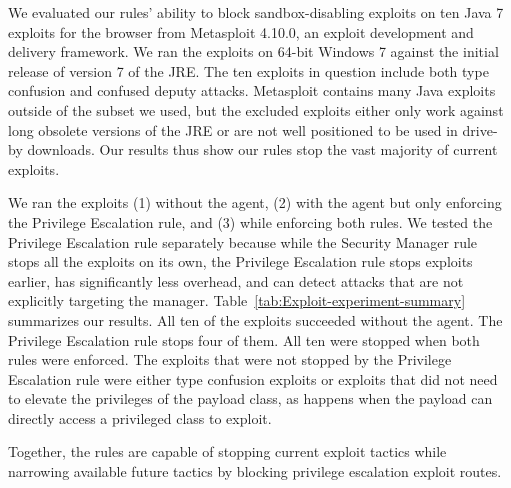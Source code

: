 \documentclass{sig-alternate}
\begin{document}
We evaluated our rules' ability to block sandbox-disabling exploits on ten
Java 7 exploits for the browser from Metasploit 4.10.0, an exploit development
and delivery framework.  We ran the exploits on 64-bit Windows 7 against the initial release of
version 7 of the JRE.  The ten exploits in question include both type confusion and confused
deputy attacks.
Metasploit contains many Java exploits outside of the 
subset we used, but the excluded exploits either only work against long obsolete
versions of the JRE or are not well positioned to be used in drive-by
downloads.  Our results thus show our rules stop the vast majority of 
current exploits.

We ran the exploits
(1) without the agent, (2) with the agent but only enforcing the Privilege
Escalation rule, and (3) while enforcing both rules.
We tested the Privilege
Escalation rule separately because while the Security Manager rule
stops all the exploits on its own, the Privilege Escalation rule 
stops exploits earlier,
has significantly less overhead, and can detect attacks that are
not explicitly targeting the manager.
 Table~\ref{tab:Exploit-experiment-summary} 
summarizes our results.  All  
ten of the exploits succeeded without the agent. The Privilege Escalation rule
stops four of them.  All ten were stopped
when both rules were enforced. The exploits that were not stopped
by the Privilege Escalation rule were either type confusion exploits
or exploits that did not need to elevate the privileges of the payload
class, as happens when the payload can directly access a privileged class to
exploit.

Together, the rules are capable of stopping current exploit tactics while
narrowing available future tactics by blocking privilege escalation exploit
routes.
\end{document}
